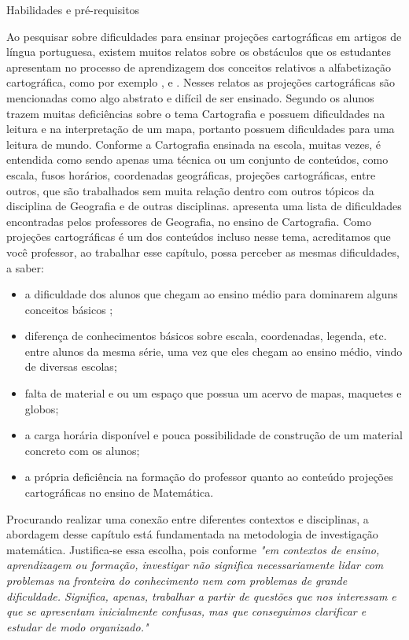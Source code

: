 \begin{apresentacao}{Habilidades e pré-requisitos}
{Ao pesquisar sobre dificuldades para ensinar projeções cartográficas em artigos de língua portuguesa, existem muitos relatos sobre os obstáculos que os estudantes apresentam no processo de aprendizagem dos conceitos relativos a alfabetização cartográfica, como por exemplo \cite{Almeida}, \cite{Lunkes} e \cite{Ludwig}. Nesses relatos as projeções cartográficas são mencionadas como algo abstrato e difícil de ser ensinado. Segundo \cite{Lunkes} os alunos trazem muitas deficiências sobre o tema Cartografia e possuem dificuldades na leitura e na interpretação de um mapa, portanto possuem dificuldades para uma leitura de mundo. Conforme \cite{Ludwig} a Cartografia ensinada na escola,  muitas vezes, é entendida como sendo apenas uma técnica ou um conjunto de conteúdos, como escala, fusos horários, coordenadas geográficas, projeções cartográficas, entre outros, que são trabalhados sem muita relação dentro com outros tópicos da disciplina de Geografia e de outras disciplinas. \cite{Lunkes} apresenta uma lista de dificuldades encontradas pelos professores de Geografia, no ensino de Cartografia. Como projeções cartográficas é um dos conteúdos incluso nesse tema, acreditamos que você professor, ao trabalhar esse capítulo, possa perceber as mesmas dificuldades, a saber:

\begin{itemize}
\item a dificuldade dos alunos que chegam ao ensino médio para dominarem alguns conceitos básicos ;
\item  diferença de conhecimentos básicos sobre escala, coordenadas, legenda, etc. entre alunos da mesma série, uma vez que eles chegam ao ensino médio, vindo de diversas escolas;
\item  falta de material e ou um espaço que possua um acervo de mapas, maquetes e globos;

\item a carga horária disponível e pouca possibilidade de construção de um material concreto com os alunos; 

\item a própria deficiência na formação do professor quanto ao conteúdo projeções cartográficas no ensino de Matemática.
\end{itemize}



Procurando realizar uma conexão entre diferentes contextos e disciplinas, a abordagem desse capítulo está fundamentada na metodologia de investigação matemática. Justifica-se essa escolha, pois conforme \citet[p. 2]{Ponte} \textit{"em contextos de ensino, aprendizagem ou formação, investigar não significa necessariamente lidar com problemas na fronteira do conhecimento nem com problemas de grande dificuldade. Significa, apenas, trabalhar a partir de questões que nos interessam e que se apresentam inicialmente confusas, mas que conseguimos clarificar e estudar de modo organizado."{}}

}
\end{apresentacao}
